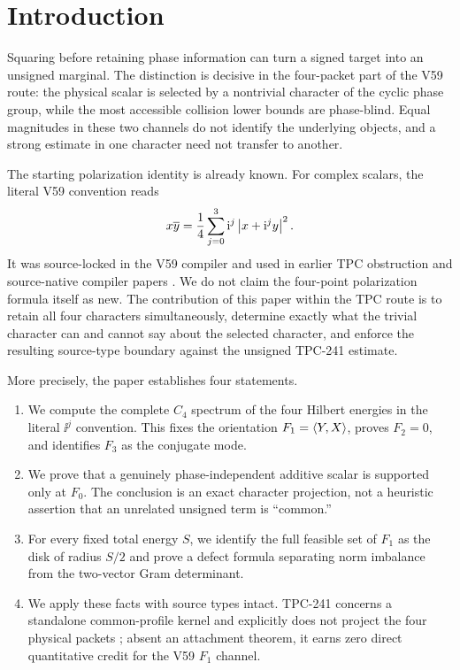 \section{Introduction}

Squaring before retaining phase information can turn a signed target into an
unsigned marginal.  The distinction is decisive in the four-packet part of
the V59 route: the physical scalar is selected by a nontrivial character of
the cyclic phase group, while the most accessible collision lower bounds are
phase-blind.  Equal magnitudes in these two channels do not identify the
underlying objects, and a strong estimate in one character need not transfer
to another.

The starting polarization identity is already known.  For complex scalars,
the literal V59 convention reads
\begin{equation}\label{eq:known-polarization}
 x\overline y=\frac14\sum_{j=0}^3\mathrm{i}^j
 \left\lvert x+\mathrm{i}^j y\right\rvert^2.
\end{equation}
It was source-locked in the V59 compiler and used in earlier TPC obstruction
and source-native compiler papers
\cite{WangV59,WangTPC222,WangTPC228}.  We do not claim the four-point
polarization formula itself as new.  The contribution of this paper within
the TPC route is to retain all four characters simultaneously, determine
exactly what the trivial character can and cannot say about the selected
character, and enforce the resulting source-type boundary against the
unsigned TPC-241 estimate.

More precisely, the paper establishes four statements.
\begin{enumerate}
  \item We compute the complete $C_4$ spectrum of the four Hilbert energies in
  the literal $\ii^j$ convention.  This fixes the orientation
  $F_1=\left\langle Y,X\right\rangle$, proves $F_2=0$, and identifies $F_3$ as the conjugate mode.
  \item We prove that a genuinely phase-independent additive scalar is
  supported only at $F_0$.  The conclusion is an exact character projection,
  not a heuristic assertion that an unrelated unsigned term is ``common.''
  \item For every fixed total energy $S$, we identify the full feasible set of
  $F_1$ as the disk of radius $S/2$ and prove a defect formula separating norm
  imbalance from the two-vector Gram determinant.
  \item We apply these facts with source types intact.  TPC-241 concerns a
  standalone common-profile kernel and explicitly does not project the four
  physical packets \cite{WangTPC241}; absent an attachment theorem, it earns
  zero direct quantitative credit for the V59 $F_1$ channel.
\end{enumerate}

